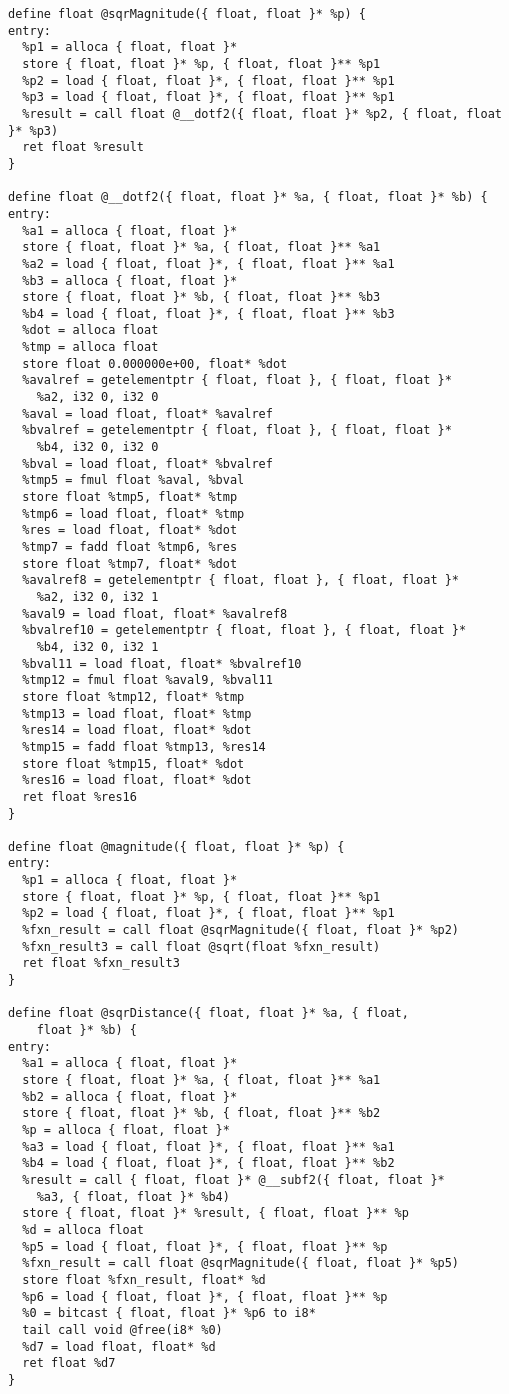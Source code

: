 \documentclass[main.tex]{subfiles}
\begin{document}
{\begin{lstlisting}
define float @sqrMagnitude({ float, float }* %p) {
entry:
  %p1 = alloca { float, float }*
  store { float, float }* %p, { float, float }** %p1
  %p2 = load { float, float }*, { float, float }** %p1
  %p3 = load { float, float }*, { float, float }** %p1
  %result = call float @__dotf2({ float, float }* %p2, { float, float }* %p3)
  ret float %result
}

define float @__dotf2({ float, float }* %a, { float, float }* %b) {
entry:
  %a1 = alloca { float, float }*
  store { float, float }* %a, { float, float }** %a1
  %a2 = load { float, float }*, { float, float }** %a1
  %b3 = alloca { float, float }*
  store { float, float }* %b, { float, float }** %b3
  %b4 = load { float, float }*, { float, float }** %b3
  %dot = alloca float
  %tmp = alloca float
  store float 0.000000e+00, float* %dot
  %avalref = getelementptr { float, float }, { float, float }*
    %a2, i32 0, i32 0
  %aval = load float, float* %avalref
  %bvalref = getelementptr { float, float }, { float, float }*
    %b4, i32 0, i32 0
  %bval = load float, float* %bvalref
  %tmp5 = fmul float %aval, %bval
  store float %tmp5, float* %tmp
  %tmp6 = load float, float* %tmp
  %res = load float, float* %dot
  %tmp7 = fadd float %tmp6, %res
  store float %tmp7, float* %dot
  %avalref8 = getelementptr { float, float }, { float, float }*
    %a2, i32 0, i32 1
  %aval9 = load float, float* %avalref8
  %bvalref10 = getelementptr { float, float }, { float, float }*
    %b4, i32 0, i32 1
  %bval11 = load float, float* %bvalref10
  %tmp12 = fmul float %aval9, %bval11
  store float %tmp12, float* %tmp
  %tmp13 = load float, float* %tmp
  %res14 = load float, float* %dot
  %tmp15 = fadd float %tmp13, %res14
  store float %tmp15, float* %dot
  %res16 = load float, float* %dot
  ret float %res16
}

define float @magnitude({ float, float }* %p) {
entry:
  %p1 = alloca { float, float }*
  store { float, float }* %p, { float, float }** %p1
  %p2 = load { float, float }*, { float, float }** %p1
  %fxn_result = call float @sqrMagnitude({ float, float }* %p2)
  %fxn_result3 = call float @sqrt(float %fxn_result)
  ret float %fxn_result3
}

define float @sqrDistance({ float, float }* %a, { float, 
    float }* %b) {
entry:
  %a1 = alloca { float, float }*
  store { float, float }* %a, { float, float }** %a1
  %b2 = alloca { float, float }*
  store { float, float }* %b, { float, float }** %b2
  %p = alloca { float, float }*
  %a3 = load { float, float }*, { float, float }** %a1
  %b4 = load { float, float }*, { float, float }** %b2
  %result = call { float, float }* @__subf2({ float, float }* 
    %a3, { float, float }* %b4)
  store { float, float }* %result, { float, float }** %p
  %d = alloca float
  %p5 = load { float, float }*, { float, float }** %p
  %fxn_result = call float @sqrMagnitude({ float, float }* %p5)
  store float %fxn_result, float* %d
  %p6 = load { float, float }*, { float, float }** %p
  %0 = bitcast { float, float }* %p6 to i8*
  tail call void @free(i8* %0)
  %d7 = load float, float* %d
  ret float %d7
}


\end{lstlisting}}
\end{document}
